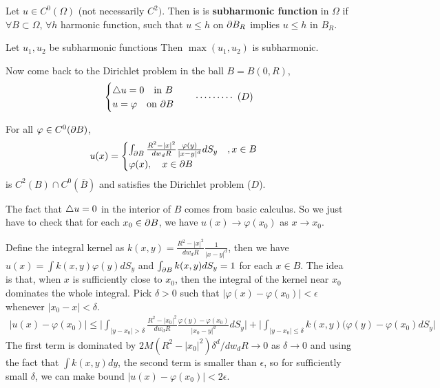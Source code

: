 \documentclass[12pt,a4paper]{article}
\newenvironment{proof}
{\begin{changemargin}{1cm}{0.5cm} 
	}%
	{\end{changemargin}
}
\newenvironment{p}
{\begin{proof} 
	}%
	{\end{proof}
}
\begin{document}
 Let $u\in C^0(\Omega)$ (not necessarily $C^2)$. Then is is \textbf{subharmonic function} in $\Omega$ if $\forall B \subset \Omega$, $\forall h$ harmonic function, such that $u\leq h$ on $\partial B_R$ implies $u\leq h$ in $B_R$.
\s 

\lem Let $u_1, u_2$ be subharmonic functions Then $\max(u_1, u_2)$ is subharmonic.
\s

Now come back to the Dirichlet problem in the ball $B = B(0, R)$,
\begin{align*}
\begin{cases}
\triangle u =0 \quad \text{in } B\\
u = \varphi \quad \text{on } \partial B
\end{cases} \quad \cdots\cdots\cdots\,\,(D)
\end{align*}
\s

\thm For all $\varphi \in C^0(\partial B)$,
\begin{align*}
u(x) = \begin{cases}
\int_{\partial B} \frac{R^2 - |x|^2}{dw_d R} \frac{\varphi(y)}{|x-y|^d} dS_y \quad, x\in B\\
\varphi(x), \quad x\in \partial B
\end{cases}
\end{align*}
is $C^2(B) \cap C^0(\bar{B})$ and satisfies the Dirichlet problem ($D$). 
\begin{p}
\pf The fact that $\triangle u =0$ in the interior of $B$ comes from basic calculus. So we just have to check that for each $x_0 \in \partial B$, we have $u(x) \rightarrow \varphi(x_0)$ as $x\rightarrow x_0$.

\quad Define the integral kernel as $k(x,y) = \frac{R^2 - |x|^2}{dw_d R} \frac{1}{|x-y|^d}$, then we have $u(x) = \int k(x,y) \varphi(y) dS_y$ and $\int_{\partial B} k(x,y) dS_y =1$ for each $x\in B$. The idea is that, when $x$ is sufficiently close to $x_0$, then the integral of the kernel near $x_0$ dominates the whole integral. Pick $\delta>0$ such that $|\varphi(x)- \varphi(x_0)|< \epsilon$ whenever $|x_0 -x| < \delta$.
\begin{align*}
|u(x)- \varphi(x_0)| \leq \Big| \int_{|y-x_0|> \delta} \frac{R^2 - |x_0|^2}{dw_d R} \frac{\varphi(y) - \varphi(x_0)}{|x_0 - y|^d} dS_y \Big| + \Big| \int_{|y-x_0| \leq \delta} k(x,y)(\varphi(y)-\varphi(x_0) dS_y \Big|
\end{align*}
The first term is dominated by $2M(R^2 - |x_0|^2)\delta^d / dw_d R \rightarrow 0$ as $\delta \rightarrow 0$ and using the fact that $\int k(x,y)dy$, the second term is smaller than $\epsilon$, so for sufficiently small $\delta$, we can make bound $|u(x) - \varphi(x_0)|< 2\epsilon$.

\eop
\end{p}
\s
\end{document}
